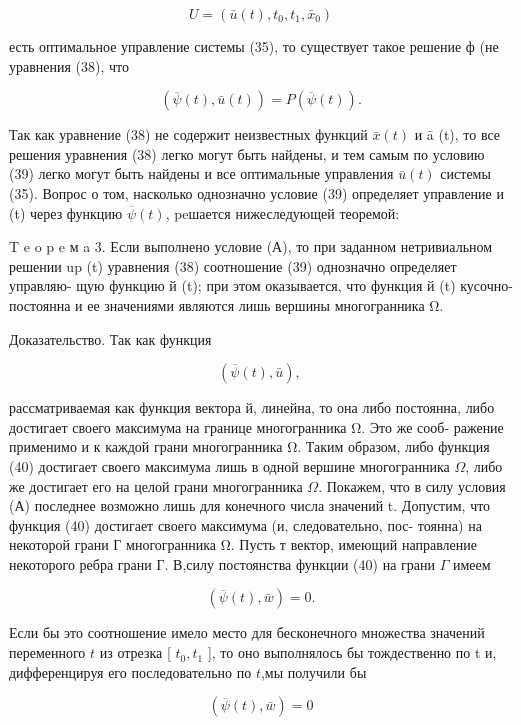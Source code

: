 \documentclass[10pt]{article}
\begin{document}
\[
U = \left( {\bar{u}\left( t\right),{t}_{0},{t}_{1},{\bar{x}}_{0}}\right)
\]

есть оптимальное управление системы (35), то существует такое решение ф (не уравнения (38), что

\[
\left( {\overline{\psi }\left( t\right),\bar{u}\left( t\right) }\right)  = P\left( {\overline{\psi }\left( t\right) }\right). \tag{39}
\]

Так как уравнение (38) не содержит неизвестных функций \(\bar{x}\left( t\right)\) и ā (t), то все решения уравнения (38) легко могут быть найдены, и тем самым по условию (39) легко могут быть найдены и все оптимальные управления \(\bar{u}\left( t\right)\) системы (35). Вопрос о том, насколько однозначно условие (39) определяет управление и (t) через функцию \(\overline{\psi }\left( t\right)\), peшается нижеследующей теоремой:

T e o p e м a 3. Если выполнено условие (А), то при заданном нетривиальном решении up (t) уравнения (38) соотношение (39) однозначно определяет управляю- щую функцию й (t); при этом оказывается, что функция й (t) кусочно-постоянна и ее значениями являются лишь вершины многогранника Ω.

Доказательство. Так как функция

\[
\left( {\overline{\psi }\left( t\right),\bar{u}}\right) \text{, } \tag{40}
\]

рассматриваемая как функция вектора й, линейна, то она либо постоянна, либо достигает своего максимума на границе многогранника Ω. Это же сооб- ражение применимо и к каждой грани многогранника Ω. Таким образом, либо функция (40) достигает своего максимума лишь в одной вершине многогранника \(\Omega\), либо же достигает его на целой грани многогранника \(\Omega\). Покажем, что в силу условия (А) последнее возможно лишь для конечного числа значений t. Допустим, что функция (40) достигает своего максимума (и, следовательно, пос- тоянна) на некоторой грани Г многогранника Ω. Пусть т вектор, имеющий направление некоторого ребра грани Г. В,силу постоянства функции (40) на грани \(\Gamma\) имеем

\[
\left( {\overline{\psi }\left( t\right),\bar{w}}\right)  = 0.
\]

Если бы это соотношение имело место для бесконечного множества значений переменного \(t\) из отрезка [ \({t}_{0},{t}_{1}\) ], то оно выполнялось бы тождественно по t и, дифференцируя его последовательно по \(t\),мы получили бы

\[
\left( {\overline{\psi }\left( t\right),\bar{w}}\right)  = 0
\]
\end{document}
